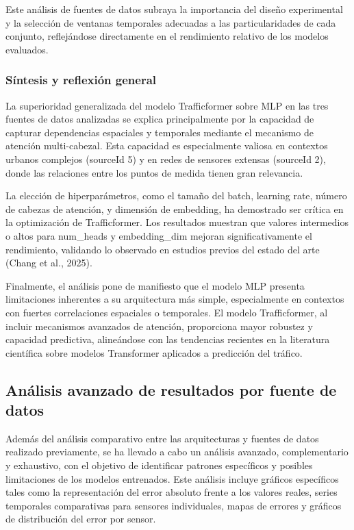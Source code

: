 Este análisis de fuentes de datos subraya la importancia del diseño experimental y la selección de ventanas temporales adecuadas a las particularidades de cada conjunto, reflejándose directamente en el rendimiento relativo de los modelos evaluados.

\subsubsection{Síntesis y reflexión general}

La superioridad generalizada del modelo Trafficformer sobre MLP en las tres fuentes de datos analizadas se explica principalmente por la capacidad de capturar dependencias espaciales y temporales mediante el mecanismo de atención multi-cabezal. Esta capacidad es especialmente valiosa en contextos urbanos complejos (sourceId 5) y en redes de sensores extensas (sourceId 2), donde las relaciones entre los puntos de medida tienen gran relevancia.

La elección de hiperparámetros, como el tamaño del batch, learning rate, número de cabezas de atención, y dimensión de embedding, ha demostrado ser crítica en la optimización de Trafficformer. Los resultados muestran que valores intermedios o altos para num_heads y embedding_dim mejoran significativamente el rendimiento, validando lo observado en estudios previos del estado del arte (Chang et al., 2025).

Finalmente, el análisis pone de manifiesto que el modelo MLP presenta limitaciones inherentes a su arquitectura más simple, especialmente en contextos con fuertes correlaciones espaciales o temporales. El modelo Trafficformer, al incluir mecanismos avanzados de atención, proporciona mayor robustez y capacidad predictiva, alineándose con las tendencias recientes en la literatura científica sobre modelos Transformer aplicados a predicción del tráfico.

\subsection{Análisis avanzado de resultados por fuente de datos}
\label{sec:analisis_avanzado_resultados}

Además del análisis comparativo entre las arquitecturas y fuentes de datos realizado previamente, se ha llevado a cabo un análisis avanzado, complementario y exhaustivo, con el objetivo de identificar patrones específicos y posibles limitaciones de los modelos entrenados. Este análisis incluye gráficos específicos tales como la representación del error absoluto frente a los valores reales, series temporales comparativas para sensores individuales, mapas de errores y gráficos de distribución del error por sensor.

